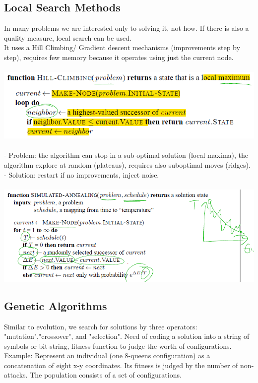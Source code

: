 \documentclass{article}
\begin{document}
\subsection{Local Search Methods}
In many problems we are interested only to solving it, not how. If there is also a quality measure, local search can be used.\\
It uses a Hill Climbing/ Gradient descent mechanisms (improvements step by step), requires few memory because it operates using just the current node.\\\\
\includegraphics[scale=0.6]{19.png}\\\\
- Problem: the algorithm can stop in a sub-optimal solution (local maxima), the algorithm explore at random (plateaus), requires also suboptimal moves (ridges).\\
- Solution: restart if no improvements, inject noise.\\\\
\includegraphics[scale=0.6]{20.png}

\subsection{Genetic Algorithms}
Similar to evolution, we search for solutions by three operators: "mutation","crossover", and "selection". Need of coding a solution into a string of symbols or bit-string, fitness function to judge the worth of configurations.\\Example: Represent an individual (one 8-queens configuration) as a concatenation of eight x-y coordinates. Its fitness is judged by the number of non-attacks. The population consists of a set of configurations.\\
\end{document}
